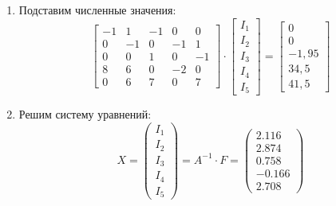 \begin{enumerate}
	\item Подставим численные значения:
	      \[
		      \begin{bmatrix}
			      -1 & 1  & -1 & 0  & 0  \\
			      0  & -1 & 0  & -1 & 1  \\
			      0  & 0  & 1  & 0  & -1 \\
			      8  & 6  & 0  & -2 & 0  \\
			      0  & 6  & 7  & 0  & 7
		      \end{bmatrix}
		      \cdot
		      \begin{bmatrix}
			      I_1 \\
			      I_2 \\
			      I_3 \\
			      I_4 \\
			      I_5
		      \end{bmatrix}
		      =
		      \begin{bmatrix}
			      0     \\
			      0     \\
			      -1,95 \\
			      34,5  \\
			      41,5
		      \end{bmatrix}
	      \]
	\item Решим систему уравнений:
	      \[
		      X
		      =
		      \begin{pmatrix}
			      I_1 \\
			      I_2 \\
			      I_3 \\
			      I_4 \\
			      I_5
		      \end{pmatrix}
		      =
		      A^{-1} \cdot F =
		      \begin{pmatrix}
			      2.116  \\
			      2.874  \\
			      0.758  \\
			      -0.166 \\
			      2.708
		      \end{pmatrix}
	      \]
\end{enumerate}
